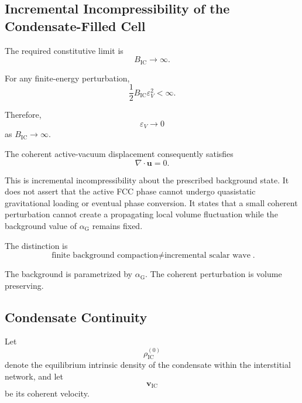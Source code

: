\subsection{Incremental Incompressibility of the Condensate-Filled Cell}

The required constitutive limit is
\begin{equation}
    \boxed{ B_{\mathrm{IC}} \rightarrow \infty }.
\end{equation}

For any finite-energy perturbation,
\begin{equation}
    \frac{1}{2} B_{\mathrm{IC}} \varepsilon_V^2 < \infty.
\end{equation}

Therefore,
\begin{equation}
    \varepsilon_V \rightarrow 0
\end{equation}
as $B_{\mathrm{IC}} \rightarrow \infty$.

The coherent active-vacuum displacement consequently satisfies
\begin{equation}
    \boxed{ \nabla\cdot\mathbf{u} = 0 }.
\end{equation}

This is incremental incompressibility about the prescribed background state. It does not assert that the active FCC phase cannot undergo quasistatic gravitational loading or eventual phase conversion. It states that a small coherent perturbation cannot create a propagating local volume fluctuation while the background value of $\alpha_{\mathrm{G}}$ remains fixed.

The distinction is
\begin{equation}
    \boxed{ \text{finite background compaction} \neq \text{incremental scalar wave} }.
\end{equation}

The background is parametrized by $\alpha_{\mathrm{G}}$. The coherent perturbation is volume preserving.

\subsection{Condensate Continuity}

Let
\begin{equation}
    \rho_{\mathrm{IC}}^{(0)}
\end{equation}
denote the equilibrium intrinsic density of the condensate within the interstitial network, and let
\begin{equation}
    \mathbf{v}_{\mathrm{IC}}
\end{equation}
be its coherent velocity.

